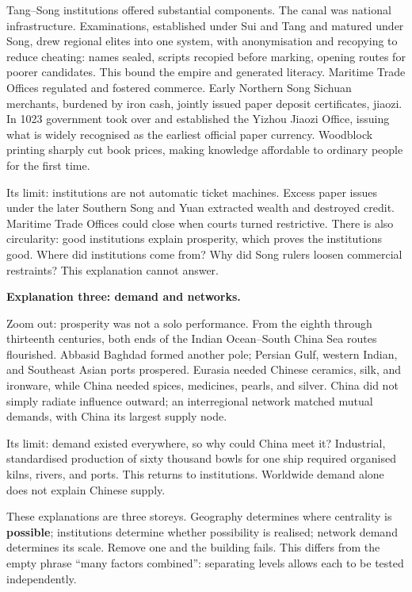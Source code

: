 Tang--Song institutions offered substantial components. The canal was national infrastructure. Examinations, established under Sui and Tang and matured under Song, drew regional elites into one system, with anonymisation and recopying to reduce cheating: names sealed, scripts recopied before marking, opening routes for poorer candidates. This bound the empire and generated literacy. Maritime Trade Offices regulated and fostered commerce. Early Northern Song Sichuan merchants, burdened by iron cash, jointly issued paper deposit certificates, jiaozi. In 1023 government took over and established the Yizhou Jiaozi Office, issuing what is widely recognised as the earliest official paper currency. Woodblock printing sharply cut book prices, making knowledge affordable to ordinary people for the first time.

Its limit: institutions are not automatic ticket machines. Excess paper issues under the later Southern Song and Yuan extracted wealth and destroyed credit. Maritime Trade Offices could close when courts turned restrictive. There is also circularity: good institutions explain prosperity, which proves the institutions good. Where did institutions come from? Why did Song rulers loosen commercial restraints? This explanation cannot answer.

\textbf{Explanation three: demand and networks.}

Zoom out: prosperity was not a solo performance. From the eighth through thirteenth centuries, both ends of the Indian Ocean--South China Sea routes flourished. Abbasid Baghdad formed another pole; Persian Gulf, western Indian, and Southeast Asian ports prospered. Eurasia needed Chinese ceramics, silk, and ironware, while China needed spices, medicines, pearls, and silver. China did not simply radiate influence outward; an interregional network matched mutual demands, with China its largest supply node.

Its limit: demand existed everywhere, so why could China meet it? Industrial, standardised production of sixty thousand bowls for one ship required organised kilns, rivers, and ports. This returns to institutions. Worldwide demand alone does not explain Chinese supply.

These explanations are three storeys. Geography determines where centrality is \textbf{possible}; institutions determine whether possibility is realised; network demand determines its scale. Remove one and the building fails. This differs from the empty phrase ``many factors combined'': separating levels allows each to be tested independently.

